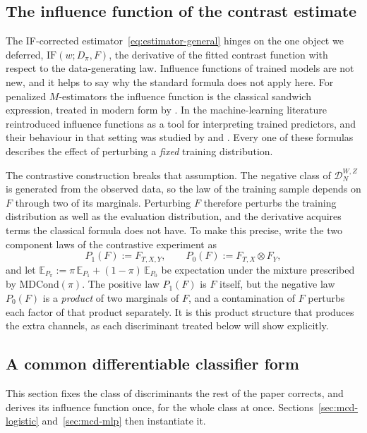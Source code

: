 \documentclass[11pt]{article}
\theoremstyle{plain}
\theoremstyle{definition}
\theoremstyle{remark}
\newcommand{\MDC}{\ensuremath{\text{MDCond}}}
\newcommand{\pE}{\ensuremath{\mathbb{E}}}
\newcommand{\ratio}{\ensuremath{\pi}}
\newcommand{\contrast}{D_{\ratio}}
\newcommand{\mDwz}[1]{\ensuremath{\mathcal{D}}_{#1}^{W,Z}}
\newcommand{\IF}{\mathrm{IF}}
\begin{document}
\subsection{The influence function of the contrast estimate}
\label{sec:mcd-if-classifier}

The IF-corrected estimator~\eqref{eq:estimator-general} hinges on the one object we deferred,
$\IF(w;\contrast,F)$, the derivative of the fitted contrast function with respect to the
data-generating law. Influence functions of trained models are not new, and it helps to say why
the standard formula does not apply here. For penalized $M$-estimators the influence function is the classical sandwich
expression, treated in modern form by \citet{avella2017}. In the machine-learning literature
\citet{kohliang2017} reintroduced influence functions as a tool for interpreting trained
predictors, and their behaviour in that setting was studied by \citet{basu2021} and
\citet{bae2022}. Every one of these formulas describes the effect of perturbing a
\emph{fixed} training distribution.

The contrastive construction breaks that assumption. The negative class of $\mDwz{N}$ is
generated from the observed data, so the law of the training sample depends on $F$ through two
of its marginals. Perturbing $F$ therefore perturbs the training distribution as well as the
evaluation distribution, and the derivative acquires terms the classical formula does not have.
To make this precise, write the two component laws of the contrastive experiment as
\begin{equation}
P_1(F) := F_{T,X,Y}, \qquad
P_0(F) := F_{T,X} \otimes F_Y ,
\label{eq:laws}
\end{equation}
and let $\pE_{P_\ratio} := \ratio\,\pE_{P_1} + (1-\ratio)\,\pE_{P_0}$ be expectation under the
mixture prescribed by $\MDC(\ratio)$. The positive law $P_1(F)$ is $F$ itself, but the negative
law $P_0(F)$ is a \emph{product} of two marginals of $F$, and a contamination of $F$ perturbs
each factor of that product separately. It is this product structure that produces the extra
channels, as each discriminant treated below will show explicitly.

\subsection{A common differentiable classifier form}
\label{sec:mcd-general-classifier}

This section fixes the class of discriminants the rest of the paper corrects, and derives its
influence function once, for the whole class at once. Sections~\ref{sec:mcd-logistic}
and~\ref{sec:mcd-mlp} then instantiate it.
\end{document}
